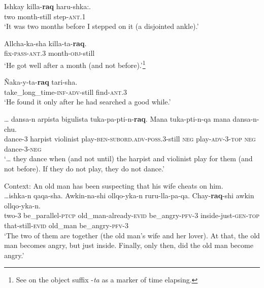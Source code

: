 \begin{exe}
	\ex\label{exAppendixQuechuaFirstSubordinate1}
	\gll Ishkay killa-\textbf{raq} haru-shka:.\\
	two month-still step-\textsc{ant}.1\\
	\glt \lq It was two months before I stepped on it (a disjointed ankle).\rq{ }\parencite[387]{Weber1989}

	\ex\label{exAppendixQuechuaFirstSubordinate2}
	\gll Allcha-ka-sha killa-ta-\textbf{raq}.\\
	fix-\textsc{pass}-\textsc{ant}.3 month-\textsc{obj}-still\\
	\glt \lq He got well after a month (and not before).'\footnote{See \textcite[183]{Weber1989} on the object suffix \mbox{-\textit{ta}} as a marker of time elapsing.} \parencite[387]{Weber1989}

	\ex\label{exAppendixQuechuaFirstSubordinate4}
	\gll Ñaka-y-ta-\textbf{raq} tari-sha.\\
	take\_long\_time-\textsc{inf}-\textsc{adv}-still find-\textsc{ant}.3\\
	\glt \lq He found it only after he had searched a good while.\rq{ }\parencite[132]{Weber1993}
	
	\ex\label{exAppendixQuechuaFirstSubordinate5}
	\gll 	… dansa-n arpista bigulista tuka-pa-pti-n-\textbf{raq}. Mana tuka-pti-n-qa mana dansa-n-chu.\\
	{} dance-3 harpist violinist play-\textsc{ben}-\textsc{subord}.\textsc{adv}-\textsc{poss}.3-still \textsc{neg} play-\textsc{adv}-3-\textsc{top} \textsc{neg} dance-3-\textsc{neg}\\
	\glt \lq … they dance when (and not until) the harpist and violinist play for them (and not before). If they do not play, they do not dance.'  \parencite[387]{Weber1989}

	\ex\label{exAppendixQuechuaFirstSubordinate6}
	Context: An old man has been suspecting that his wife cheats on him.\\
	\gll …ishka-n qaqa-sha. Awkin-na-shi ollqo-yka-n ruru-lla-pa-qa. Chay-\textbf{raq}-shi awkin ollqo-yka-n.\\
	\phantom{…}two-3 be\_parallel-\textsc{ptcp} old\_man-already-\textsc{evid} be\_angry-\textsc{pfv}-3 inside-just-\textsc{gen}-\textsc{top} that-still-\textsc{evid} old\_man be\_angry-\textsc{pfv}-3\\
	\glt \lq The two of them are together (the old man’s wife and her lover). At that, the old man becomes angry, but just inside. Finally, only then, did the old man become angry.\rq{ }\parencite[379]{Weber1989}
\end{exe}
\pagebreak
